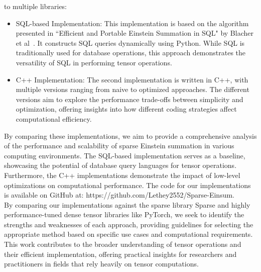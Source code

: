 to multiple libraries:
%
\begin{itemize}
      \item SQL-based Implementation:
            This implementation is based on the algorithm presented in ``Efficient and
            Portable Einstein Summation in SQL" by Blacher et al~\cite{sql_einsum}.
            It constructs SQL queries dynamically using Python. While SQL is
            traditionally used for database operations, this approach demonstrates
            the versatility of SQL in performing tensor operations.
      \item C++ Implementation: The second implementation is written in C++, with multiple
            versions ranging from naive to optimized approaches. The different versions
            aim to explore the performance trade-offs between simplicity and optimization,
            offering insights into how different coding strategies affect computational
            efficiency.
\end{itemize}
%
%
By comparing these implementations, we aim to provide a comprehensive analysis of
the performance and scalability of sparse Einstein summation in various
computing environments. The SQL-based implementation serves as a baseline,
showcasing the potential of database query languages for tensor operations.
Furthermore, the C++ implementations demonstrate the impact of low-level optimizations
on computational performance. The code for our implementations is available on
GitHub at: https://github.com/Lethey2552/Sparse-Einsum.
\\
By comparing our implementations against the sparse library Sparse and highly
performance-tuned dense tensor libraries like PyTorch, we seek to identify the
strengths and weaknesses of each approach, providing guidelines for selecting the
appropriate method based on specific use cases and computational requirements.
This work contributes to the broader understanding of tensor operations and their
efficient implementation, offering practical insights for researchers and
practitioners in fields that rely heavily on tensor computations.